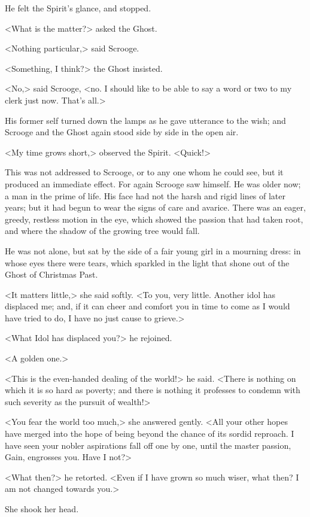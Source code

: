 He felt the Spirit's glance, and stopped.

<What is the matter?> asked the Ghost.

<Nothing particular,> said Scrooge.

<Something, I think?> the Ghost insisted.

<No,> said Scrooge, <no. I should like to be able to say a word or two to my clerk just now. That's all.>

His former self turned down the lamps as he gave utterance to the wish; and Scrooge and the Ghost again stood side by side in the open air.

<My time grows short,> observed the Spirit. <Quick!>

This was not addressed to Scrooge, or to any one whom he could see, but it produced an immediate effect. For again Scrooge saw himself. He was older now; a man in the prime of life. His face had not the harsh and rigid lines of later years; but it had begun to wear the signs of care and avarice. There was an eager, greedy, restless motion in the eye, which showed the passion that had taken root, and where the shadow of the growing tree would fall.

He was not alone, but sat by the side of a fair young girl in a mourning dress: in whose eyes there were tears, which sparkled in the light that shone out of the Ghost of Christmas Past.

<It matters little,> she said softly. <To you, very little. Another idol has displaced me; and, if it can cheer and comfort you in time to come as I would have tried to do, I have no just cause to grieve.>

<What Idol has displaced you?> he rejoined.

<A golden one.>

<This is the even-handed dealing of the world!> he said. <There is nothing on which it is so hard as poverty; and there is nothing it professes to condemn with such severity as the pursuit of wealth!>

<You fear the world too much,> she answered gently. <All your other hopes have merged into the hope of being beyond the chance of its sordid reproach. I have seen your nobler aspirations fall off one by one, until the master passion, Gain, engrosses you. Have I not?>

<What then?> he retorted. <Even if I have grown so much wiser, what then? I am not changed towards you.>

She shook her head.

